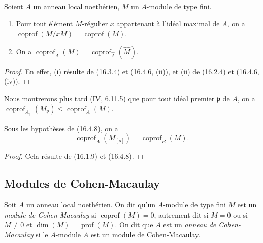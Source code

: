 \begin{proposition}[16.4.10]
\label{0.16.4.10-fr}
Soient $A$ un anneau local noethérien, $M$ un $A$-module de type fini.
\begin{enumerate}
  \item[(i)] Pour tout élément $M$-régulier $x$ appartenant à l'idéal maximal
  de $A$, on a
  $\operatorname{coprof}(M/xM)=\operatorname{coprof}(M)$.
  \item[(ii)] On a
  $\operatorname{coprof}_A(M)=\operatorname{coprof}_{\widehat A}(\widehat M)$.
\end{enumerate}
\end{proposition}

\begin{proof}
En effet, (i) résulte de (16.3.4) et (16.4.6, (ii)), et (ii) de (16.2.4) et
(16.4.6, (iv)).
\end{proof}

Nous montrerons plus tard (IV, 6.11.5) que pour tout idéal premier
$\mathfrak{p}$ de $A$, on a
$\operatorname{coprof}_{A_{\mathfrak{p}}}(M_{\mathfrak{p}})
\leq\operatorname{coprof}_A(M)$.

\begin{proposition}[16.4.11]
\label{0.16.4.11-fr}
Sous les hypothèses de (16.4.8), on a
\begin{equation}
\label{0.16.4.11.1-fr}
\tag{16.4.11.1}
  \operatorname{coprof}_A(M_{[\rho]})=\operatorname{coprof}_B(M).
\end{equation}
\end{proposition}

\begin{proof}
Cela résulte de (16.1.9) et (16.4.8).
\end{proof}

\subsection{Modules de Cohen-Macaulay}
\label{subsection:0.16.5-fr}

\begin{definition}[16.5.1]
\label{0.16.5.1-fr}
Soit $A$ un anneau local noethérien. On dit qu'un $A$-module de type fini $M$
est un \emph{module de Cohen-Macaulay} si
$\operatorname{coprof}(M)=0$, autrement dit si $M=0$ ou si $M\neq0$ et
$\dim(M)=\operatorname{prof}(M)$. On dit que $A$ est un
\emph{anneau de Cohen-Macaulay} si le $A$-module $A$ est un module de
Cohen-Macaulay.
\end{definition}

